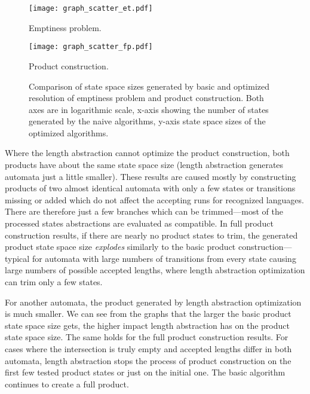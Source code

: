 \begin{figure*}[ht]
    \centering
    \begin{minipage}{0.49\linewidth}
        \centering
        \texttt{[image: graph\_scatter\_et.pdf]}
        \caption{Emptiness problem.}
        \label{fig:graph:et_state_space_sizes_comp}
    \end{minipage}
    \hfill
    \begin{minipage}{0.49\linewidth}
        \centering
        \texttt{[image: graph\_scatter\_fp.pdf]}
        \caption{Product construction.}
        \label{fig:graph:fp_state_space_sizes_comp}
    \end{minipage}
    \vspace{0.5cm}
    \caption{Comparison of state space sizes generated by basic and optimized resolution of emptiness problem and product construction. Both axes are in logarithmic scale, x-axis showing the number of states generated by the naive algorithms, y-axis state space sizes of the optimized algorithms.}
    \label{fig:graph:product_state_space_sizes}
\end{figure*}

Where the length abstraction cannot optimize the product construction, both products have about the same state space size (length abstraction generates automata just a little smaller). These results are caused mostly by constructing products of two almost identical automata with only a few states or transitions missing or added which do not affect the accepting runs for recognized languages. There are therefore just a few branches which can be trimmed---most of the processed states abstractions are evaluated as compatible. In full product construction results, if there are nearly no product states to trim, the generated product state space size \emph{explodes} similarly to the basic product construction---typical for automata with large numbers of transitions from every state causing large numbers of possible accepted lengths, where length abstraction optimization can trim only a few states.

For another automata, the product generated by length abstraction optimization is much smaller. We can see from the graphs that the larger the basic product state space size gets, the higher impact length abstraction has on the product state space size. The same holds for the full product construction results. For cases where the intersection is truly empty and accepted lengths differ in both automata, length abstraction stops the process of product construction on the first few tested product states or just on the initial one. The basic algorithm continues to create a full product.

